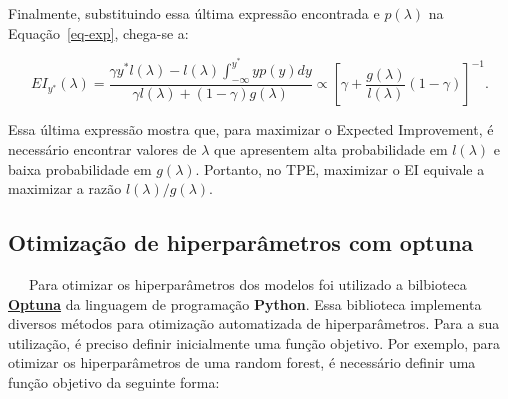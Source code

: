 \documentclass[
  12pt,
  a4paper,
]{scrreprt}
\begin{document}
Finalmente, substituindo essa última expressão encontrada e
\(p\left(\lambda\right)\) na Equação~\ref{eq-exp}, chega-se a:

\[
EI_{y^*}\left(\lambda\right) = \frac{\gamma y^* l\left(\lambda\right) - l\left(\lambda\right) \int_{-\infty}^{y^*} yp\left(y\right)dy}{\gamma l\left(\lambda\right) + \left(1 - \gamma\right)g\left(\lambda\right)} \propto \left[\gamma + \frac{g\left(\lambda\right)}{l\left(\lambda\right)} \left(1 - \gamma\right)\right]^{-1}\text{.}
\]

Essa última expressão mostra que, para maximizar o Expected Improvement,
é necessário encontrar valores de \(\lambda\) que apresentem alta
probabilidade em \(l\left(\lambda\right)\) e baixa probabilidade em
\(g\left(\lambda\right)\). Portanto, no TPE, maximizar o EI equivale a
maximizar a razão \(l\left(\lambda\right) / g\left(\lambda\right)\).

\subsection{Otimização de hiperparâmetros com
optuna}\label{otimizauxe7uxe3o-de-hiperparuxe2metros-com-optuna}

~~~Para otimizar os hiperparâmetros dos modelos foi utilizado a
bilbioteca \href{https://optuna.org/}{\textbf{Optuna}} da linguagem de
programação \textbf{Python}. Essa biblioteca implementa diversos métodos
para otimização automatizada de hiperparâmetros. Para a sua utilização,
é preciso definir inicialmente uma função objetivo. Por exemplo, para
otimizar os hiperparâmetros de uma random forest, é necessário definir
uma função objetivo da seguinte forma:
\end{document}

